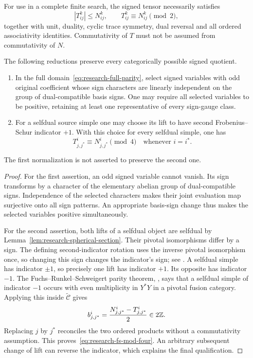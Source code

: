 For use in a complete finite search, the signed tensor necessarily
satisfies
\begin{equation}\label{eq:research-full-parity}
 |T_{ij}^k|\leq N_{ij}^k,\qquad
 T_{ij}^k\equiv N_{ij}^k\pmod2,
\end{equation}
together with unit, duality, cyclic trace symmetry, dual reversal and
all ordered associativity identities.  Commutativity of $T$ must not be
assumed from commutativity of $N$.

\begin{lemma}
\label{lem:research-two-normalizations}
The following reductions preserve every categorically possible signed
quotient.
\begin{enumerate}
\item In the full domain~\eqref{eq:research-full-parity}, select signed
variables with odd original coefficient whose sign characters are
linearly independent on the group of dual-compatible basis signs.
One may require all selected variables to be positive, retaining at
least one representative of every sign-gauge class.
\item For a selfdual source simple one may choose its lift to have
second Frobenius--Schur indicator $+1$.  With this choice for every
selfdual simple, one has
\begin{equation}\label{eq:research-fs-mod-four}
 T_{j,j^*}^{i}\equiv N_{j,j^*}^{i}\pmod4
 \quad\text{whenever }i=i^*.
\end{equation}
\end{enumerate}
The first normalization is not asserted to preserve the second one.
\end{lemma}
\begin{proof}
For the first assertion, an odd signed variable cannot vanish.
Its sign transforms by a character of the elementary abelian group
of dual-compatible signs.  Independence of the selected characters
makes their joint evaluation map surjective onto all sign patterns.
An appropriate basis-sign change thus makes the selected variables
positive simultaneously.

For the second assertion, both lifts of a selfdual object are selfdual
by Lemma~\ref{lem:research-spherical-section}.  Their pivotal
isomorphisms differ by a sign.  The defining second-indicator rotation
uses the inverse pivotal isomorphism once, so changing this sign
changes the indicator's sign; see \cite[Definition~2.14 and
Lemma~2.16]{LPRV}.  A selfdual simple has indicator $\pm1$, so precisely
one lift has indicator $+1$.  Its opposite has indicator $-1$.
The Fuchs--Runkel--Schweigert parity theorem,
\cite[Theorem~3.9]{LPRV}, says that a selfdual simple of indicator $-1$
occurs with even multiplicity in $Y^*Y$ in a pivotal fusion category.
Applying this inside $\widetilde{\mathcal C}$ gives
\[
 b_{j,j^*}^{i}
 =\frac{N_{j,j^*}^{i}-T_{j,j^*}^{i}}2\in2\mathbb Z.
\]
Replacing $j$ by $j^*$ reconciles the two ordered products without a
commutativity assumption.  This proves~\eqref{eq:research-fs-mod-four}.
An arbitrary subsequent change of lift can reverse the indicator,
which explains the final qualification.
\end{proof}

